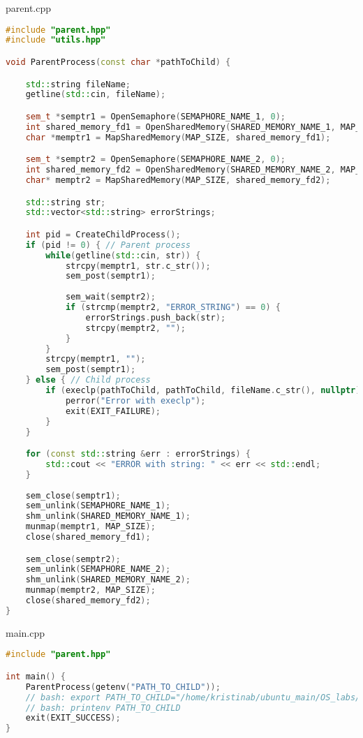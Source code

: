 \documentclass[a4paper, 12pt]{article}
\begin{document}
parent.cpp
\begin{lstlisting}[language=C++]
#include "parent.hpp"
#include "utils.hpp"

void ParentProcess(const char *pathToChild) {

    std::string fileName;
    getline(std::cin, fileName);

    sem_t *semptr1 = OpenSemaphore(SEMAPHORE_NAME_1, 0);
    int shared_memory_fd1 = OpenSharedMemory(SHARED_MEMORY_NAME_1, MAP_SIZE);
    char *memptr1 = MapSharedMemory(MAP_SIZE, shared_memory_fd1);

    sem_t *semptr2 = OpenSemaphore(SEMAPHORE_NAME_2, 0);
    int shared_memory_fd2 = OpenSharedMemory(SHARED_MEMORY_NAME_2, MAP_SIZE);
    char* memptr2 = MapSharedMemory(MAP_SIZE, shared_memory_fd2);

    std::string str;
    std::vector<std::string> errorStrings;

    int pid = CreateChildProcess();
    if (pid != 0) { // Parent process
        while(getline(std::cin, str)) {
            strcpy(memptr1, str.c_str());
            sem_post(semptr1); 
            
            sem_wait(semptr2);
            if (strcmp(memptr2, "ERROR_STRING") == 0) {
                errorStrings.push_back(str);
                strcpy(memptr2, "");
            }
        }
        strcpy(memptr1, "");
        sem_post(semptr1);
    } else { // Child process
        if (execlp(pathToChild, pathToChild, fileName.c_str(), nullptr) == -1) { // to child.cpp
            perror("Error with execlp");
            exit(EXIT_FAILURE);
        } 
    }

    for (const std::string &err : errorStrings) {
        std::cout << "ERROR with string: " << err << std::endl;
    }
        
    sem_close(semptr1);
    sem_unlink(SEMAPHORE_NAME_1);
    shm_unlink(SHARED_MEMORY_NAME_1);
    munmap(memptr1, MAP_SIZE);
    close(shared_memory_fd1);

    sem_close(semptr2);
    sem_unlink(SEMAPHORE_NAME_2);
    shm_unlink(SHARED_MEMORY_NAME_2);
    munmap(memptr2, MAP_SIZE);
    close(shared_memory_fd2);
}
\end{lstlisting}

main.cpp
\begin{lstlisting}[language=C++]
#include "parent.hpp"

int main() {
    ParentProcess(getenv("PATH_TO_CHILD"));
    // bash: export PATH_TO_CHILD="/home/kristinab/ubuntu_main/OS_labs/build/lab3/child3"
    // bash: printenv PATH_TO_CHILD
    exit(EXIT_SUCCESS);
}
\end{lstlisting}
\end{document}
